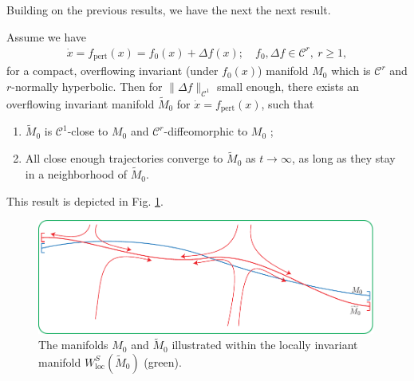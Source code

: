 Building on the previous results, we have the next the next result.
\begin{theorem}[Fenichel (1971)]
Assume we have
\begin{align}
	\dot{x}= f_{ \textrm{pert} }(x) = f_{0}(x) + \Delta f(x);\quad f_0, \Delta f \in \mathcal{C}^{r},\ r\geq 1,
\end{align}
for a compact, overflowing invariant (under $f_0(x)$) manifold $M_0$ which is $\mathcal{C}^{r}$ and $r$-normally hyperbolic. Then for $\|\Delta f \|_{\mathcal{C}^{1}}$ small enough, there exists an overflowing invariant manifold $\tilde{M}_0$ for $\dot{x}=f_{ \textrm{pert} }(x)$, such that
\begin{enumerate}
	\item $\tilde{M}_{0}$ is $\mathcal{C}^{1}$-close to $M_0$ and $\mathcal{C}^{r}$-diffeomorphic to $M_0$ ;
	\item All close enough trajectories converge to $\tilde{M}_{0}$ as $t \to \infty $, as long as they stay in a neighborhood of $\tilde{M}_{0}$.
\end{enumerate}
This result is depicted in Fig. \ref{fig:fenichel_thm2}.
\begin{figure}[h!]
	\centering
	\includegraphics[width=0.99\textwidth]{figures/ch9/15fenichel_thm2.pdf}
	\caption{The manifolds $M_0$ and $\tilde{M}_{0}$ illustrated within the locally invariant manifold $W^{S}_{ \textrm{loc} }(\tilde{M}_{0})$ (green).}
	\label{fig:fenichel_thm2}
\end{figure}
\end{theorem}

